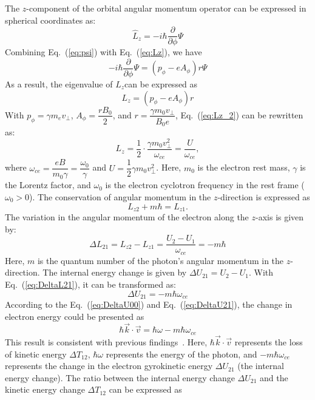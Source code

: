 \documentclass{cpbtex}
\begin{document}
\begin{CJK*}{GBK}{song}
The $z$-component of the orbital angular momentum operator can be expressed in spherical coordinates as:
\begin{equation}
\hat{L}_z = -i\hbar\frac{\partial}{\partial\phi} \Psi \label{eq:Lz}
\end{equation}
Combining Eq.~(\ref{eq:psi}) with Eq.~(\ref{eq:Lz}), we have 
\begin{equation}
-i\hbar \frac{\partial}{\partial \phi} \Psi = (p_\phi - eA_\phi) r \Psi
\end{equation}
As a result, the eigenvalue of  $L_z $can be expressed as
\begin{equation}
L_z = (p_\phi - e A_\phi) r  \label{eq:Lz_2}
\end{equation}
With \( p_\phi = \gamma m_e v_\perp \), \( A_\phi = \dfrac{r B_0}{2} \), and \( r = \dfrac{\gamma m_0 v_\perp}{B_0 e} \), Eq.~(\ref{eq:Lz_2}) can be rewritten as:
\begin{equation}
L_z = \frac{1}{2} \cdot \frac{\gamma m_0 v_\perp^2}{\omega_{ce}} = \frac{U}{\omega_{ce}},
\end{equation}
where \(\omega_{ce} = \dfrac{eB}{m_0 \gamma} = \dfrac{\omega_0}{\gamma}\) and \(U = \dfrac{1}{2} \gamma m_0 v_\perp^2\).
Here, \( m_0 \) is the electron rest mass, \( \gamma \) is the Lorentz factor, and \( \omega_0 \) is the electron cyclotron frequency in the rest frame (\( \omega_0 > 0 \)). The conservation of angular momentum in the \( z \)-direction is expressed as
\[
L_{z2} + m\hbar = L_{z1}.
\]
The variation in the angular momentum of the electron along the \( z \)-axis is given by:
\begin{equation}
\Delta L_{21} = L_{z2} - L_{z1} = \frac{U_2 - U_1}{\omega_{ce}} = -m\hbar \label{eq:DeltaL21}
\end{equation}
Here, \( m \) is the quantum number of the photon's angular momentum in the \( z \)-direction. The internal energy change is given by \( \Delta U_{21} = U_2 - U_1 \). With Eq.~(\ref{eq:DeltaL21}), it can be transformed as:
\begin{equation}
\Delta U_{21}=-m \hbar \omega_{ce}  \label{eq:DeltaU21}
\end{equation}
According to the Eq.~(\ref{eq:DeltaU00})  and Eq.~(\ref{eq:DeltaU21}), the change in electron energy  could be presented as 
\begin{equation}
\hbar \vec{k} \cdot \vec{v} = \hbar \omega - m \hbar \omega_{ce}
\end{equation}
This result is consistent with previous findings~\cite{tamm1959general, frank1960optics, nezlin1976negative, coppi1976slide, frolov1986excitation, ginzburg1996radiation}. Here, \( \hbar \vec{k} \cdot \vec{v} \) represents the loss of kinetic energy \( \Delta T_{12} \), \( \hbar \omega \) represents the energy of the photon, and \( -m \hbar \omega_{ce} \) represents the change in the electron gyrokinetic energy \( \Delta U_{21} \) (the internal energy change). The ratio between the internal energy change \( \Delta U_{21} \) and the kinetic energy change \( \Delta T_{12} \) can be expressed as

\end{CJK*}
\end{document}
